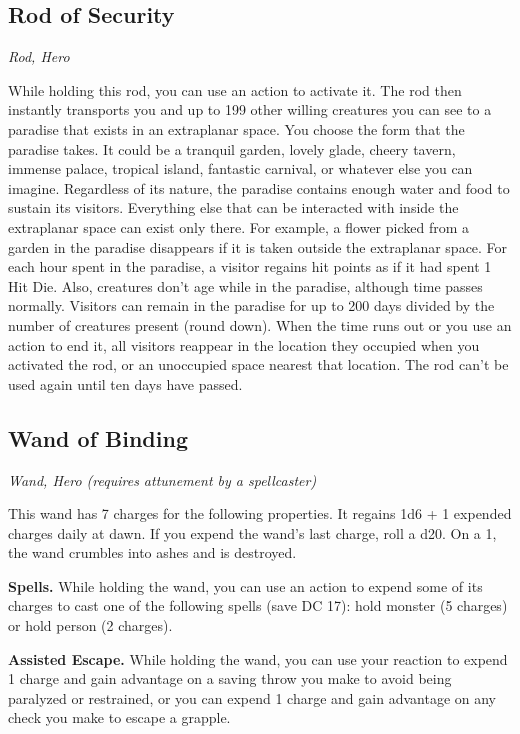 \subsection{Rod of Security}
\textit{Rod, Hero} 

While holding this rod, you can use an action to activate it. The rod then instantly transports you and up to 199 other willing creatures you can see to a paradise that exists in an extraplanar space. You choose the form that the paradise takes. It could be a tranquil garden, lovely glade, cheery tavern, immense palace, tropical island, fantastic carnival, or whatever else you can imagine. Regardless of its nature, the paradise contains enough water and food to sustain its visitors. Everything else that can be interacted with inside the extraplanar space can exist only there. For example, a flower picked from a garden in the paradise disappears if it is taken outside the extraplanar space.  For each hour spent in the paradise, a visitor regains hit points as if it had spent 1 Hit Die. Also, creatures don't age while in the paradise, although time passes normally. Visitors can remain in the paradise for up to 200 days divided by the number of creatures present (round down).  When the time runs out or you use an action to end it, all visitors reappear in the location they occupied when you activated the rod, or an unoccupied space nearest that location. The rod can't be used again until ten days have passed.

\subsection{Wand of Binding}
\textit{Wand, Hero (requires attunement by a spellcaster)} 

This wand has 7 charges for the following properties. It regains 1d6 + 1 expended charges daily at dawn. If you expend the wand's last charge, roll a d20. On a 1, the wand crumbles into ashes and is destroyed.

\textbf{Spells.} While holding the wand, you can use an action to expend some of its charges to cast one of the following spells (save DC 17): hold monster (5 charges) or hold person (2 charges).

\textbf{Assisted Escape.} While holding the wand, you can use your reaction to expend 1 charge and gain advantage on a saving throw you make to avoid being paralyzed or restrained, or you can expend 1 charge and gain advantage on any check you make to escape a grapple.

